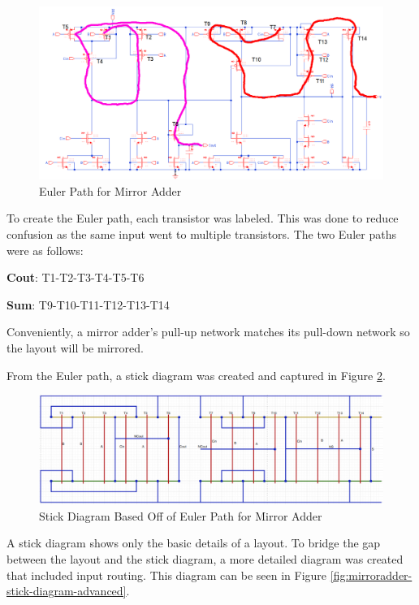 \documentclass[11pt]{article}
\begin{document}
		\begin{figure}[H]
			\centering
			\includegraphics[width=1\linewidth]{"Pictures/Mirror Adder Euler Path"}
			\caption{Euler Path for Mirror Adder}
			\label{fig:mirror-adder-euler-path}
		\end{figure}
		
		To create the Euler path, each transistor was labeled. This was done to reduce confusion as the same input went to multiple transistors. The two Euler paths were as follows:
		
		\textbf{Cout}: T1-T2-T3-T4-T5-T6
		
		\textbf{Sum}: T9-T10-T11-T12-T13-T14
		
		Conveniently, a mirror adder's pull-up network matches its pull-down network so the layout will be mirrored. 
		
		
		From the Euler path, a stick diagram was created and captured in Figure \ref{fig:mirroradder-stick-diagram}.
		
		\begin{figure}[H]
			\centering
			\includegraphics[width=1\linewidth]{"Pictures/MirrorAdder Stick Diagram"}
			\caption{Stick Diagram Based Off of Euler Path for Mirror Adder}
			\label{fig:mirroradder-stick-diagram}
		\end{figure}
		
		A stick diagram shows only the basic details of a layout. To bridge the gap between the layout and the stick diagram, a more detailed diagram was created that included input routing. This diagram can be seen in Figure \ref{fig:mirroradder-stick-diagram-advanced}.
		
\end{document}
